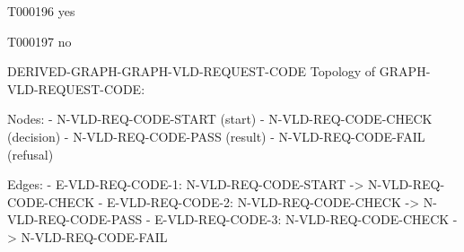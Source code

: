 \documentclass[11pt,a4paper]{article}
\begin{document}
\begin{atlastext}{T000196}
yes
\end{atlastext}
\begin{atlastext}{T000197}
no
\end{atlastext}
\par\noindent\begin{minipage}{\linewidth}
\begin{atlasderived}{DERIVED-GRAPH-GRAPH-VLD-REQUEST-CODE}
Topology of GRAPH-VLD-REQUEST-CODE:

Nodes:
- N-VLD-REQ-CODE-START (start)
- N-VLD-REQ-CODE-CHECK (decision)
- N-VLD-REQ-CODE-PASS (result)
- N-VLD-REQ-CODE-FAIL (refusal)

Edges:
- E-VLD-REQ-CODE-1: N-VLD-REQ-CODE-START -> N-VLD-REQ-CODE-CHECK
- E-VLD-REQ-CODE-2: N-VLD-REQ-CODE-CHECK -> N-VLD-REQ-CODE-PASS
- E-VLD-REQ-CODE-3: N-VLD-REQ-CODE-CHECK -> N-VLD-REQ-CODE-FAIL
\end{atlasderived}
\end{minipage}\par
\clearpage
{}\par
{}\par
\end{document}
